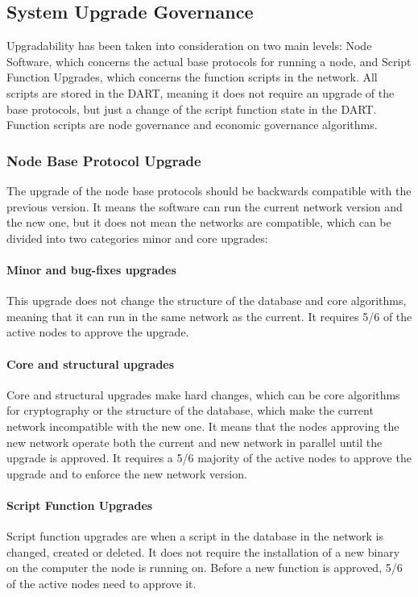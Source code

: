 \subsection{System Upgrade Governance}
Upgradability has been taken into consideration on two main levels: Node Software, which concerns the actual base protocols for running a node, and Script Function Upgrades, which concerns the function scripts in the network. All scripts are stored in the DART, meaning it does not require an upgrade of the base protocols, but just a change of the script function state in the DART. Function scripts are node governance and economic governance algorithms.

\subsubsection{Node Base Protocol Upgrade}
The upgrade of the node base protocols should be backwards compatible with the previous version. It means the software can run the current network version and the new one, but it does not mean the networks are compatible, which can be divided into two categories minor and core upgrades:

\paragraph{Minor and bug-fixes upgrades}
This upgrade does not change the structure of the database and core algorithms, meaning that it can run in the same network as the current. It requires 5/6 of the active nodes to approve the upgrade. 
\paragraph{Core and structural upgrades}
Core and structural upgrades make hard changes, which can be core algorithms for cryptography or the structure of the database, which make the current network incompatible with the new one. It means that the nodes approving the new network operate both the current and new network in parallel until the upgrade is approved. It requires a 5/6 majority of the active nodes to approve the upgrade and to enforce the new network version. 
\paragraph{Script Function Upgrades}
Script function upgrades are when a script in the database in the network is changed, created or deleted. It does not require the installation of a new binary on the computer the node is running on. Before a new function is approved, 5/6 of the active nodes need to approve it.
